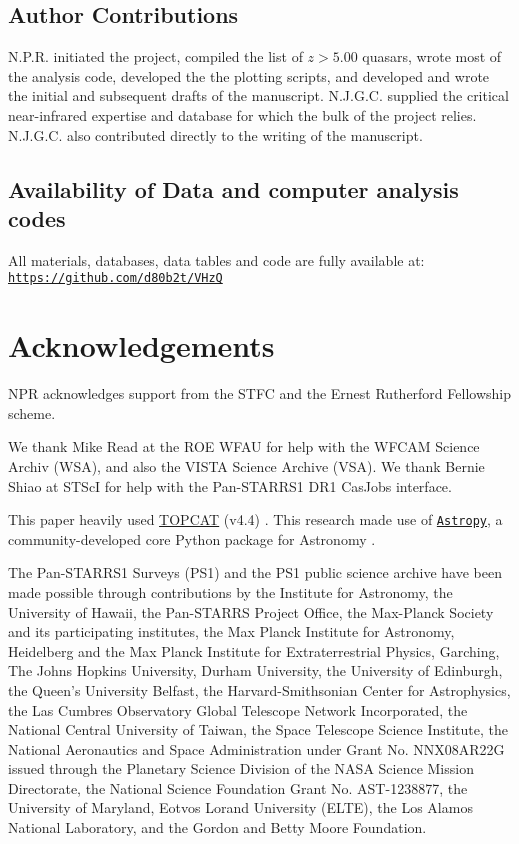 \documentclass[usenatbib]{mnras}
\begin{document}
\subsection*{Author Contributions}   
N.P.R. initiated the project, compiled the list of $z>5.00$ quasars, wrote most of the analysis code, developed the the plotting scripts, and developed and wrote the initial and subsequent drafts of the manuscript.
N.J.G.C. supplied the critical near-infrared expertise and database for which the bulk of the project relies. N.J.G.C. also contributed directly to the writing of the manuscript.



\subsection*{Availability of Data and computer analysis codes} 
All materials, databases, data tables and code are fully available at: 
\href{https://github.com/d80b2t/VHzQ}{\tt https://github.com/d80b2t/VHzQ}


\section*{Acknowledgements}
NPR acknowledges support from the STFC and the Ernest Rutherford Fellowship scheme. 

We thank Mike Read at the ROE WFAU for help with the WFCAM Science Archiv (WSA), and 
also the VISTA Science Archive (VSA). We thank Bernie Shiao at STScI for help with the Pan-STARRS1 DR1 CasJobs interface. 

This paper heavily used \href{http://www.star.bris.ac.uk/~mbt/topcat/}{TOPCAT} (v4.4)
\citep[][]{Taylor2005, Taylor2011}.
This research made use of \href{http://www.astropy.org}{\tt Astropy}, 
a community-developed core Python package for Astronomy 
\citep{AstropyCollaboration2013, AstropyCollaboration2018}. 

The Pan-STARRS1 Surveys (PS1) and the PS1 public science archive have
been made possible through contributions by the Institute for
Astronomy, the University of Hawaii, the Pan-STARRS Project Office,
the Max-Planck Society and its participating institutes, the Max
Planck Institute for Astronomy, Heidelberg and the Max Planck
Institute for Extraterrestrial Physics, Garching, The Johns Hopkins
University, Durham University, the University of Edinburgh, the
Queen's University Belfast, the Harvard-Smithsonian Center for
Astrophysics, the Las Cumbres Observatory Global Telescope Network
Incorporated, the National Central University of Taiwan, the Space
Telescope Science Institute, the National Aeronautics and Space
Administration under Grant No. NNX08AR22G issued through the Planetary
Science Division of the NASA Science Mission Directorate, the National
Science Foundation Grant No. AST-1238877, the University of Maryland,
Eotvos Lorand University (ELTE), the Los Alamos National Laboratory,
and the Gordon and Betty Moore Foundation.
\end{document}
